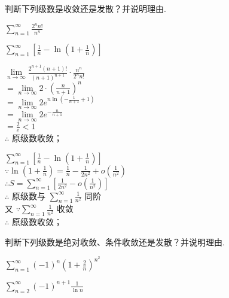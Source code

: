 \begin{problem}[points = 8]
判断下列级数是收敛还是发散？并说明理由.
\end{problem}
\begin{calculations}[columns = 2, label = (\arabic*), hsep = 8em]
    \item $\sum\limits_{n = 1}^{\infty} \frac{2^nn!}{n^n}$
    \item $\sum\limits_{n = 1}^{\infty} \left[\frac{1}{n} - \ln{\left(1 + \frac{1}{n}\right)}\right]$
\end{calculations}
\begin{solution}
    \begin{calculations}[columns = 2, label = (\arabic*), hsep = 5em]
        \item $\lim\limits_{n \to \infty} \frac{2^{n + 1}(n + 1)!}{(n + 1)^{n + 1}}\cdot\frac{n^n}{2^nn!}$ \\
        $= \lim\limits_{n \to \infty} 2\cdot\left(\frac{n}{n + 1}\right)^n$ \\
        $= \lim\limits_{n \to \infty} 2e^{n\ln{(-\frac{1}{n + 1} + 1)}}$ \\
        $= \lim\limits_{n \to \infty} 2e^{-\frac{n}{n + 1}}$ \\
        $= \frac{2}{e} < 1$ \\
        $\therefore$ 原级数收敛；

        \item $\sum\limits_{n = 1}^{\infty} \left[\frac{1}{n} - \ln{\left(1 + \frac{1}{n}\right)}\right]$ \\
        $\because \ln{\left(1 + \frac{1}{n}\right)} = \frac{1}{n} - \frac{1}{2n^2}+o\left(\frac{1}{n^2}\right)$ \\
        $\therefore S = \sum\limits_{n = 1}^{\infty} \left[\frac{1}{2n^2}-o\left(\frac{1}{n^2}\right)\right]$ \\
        $\therefore$ 原级数与 $\sum\limits_{n = 1}^{\infty} \frac{1}{n^2}$ 同阶 \\
        又 $\because \sum\limits_{n = 1}^{\infty} \frac{1}{n^2}$ 收敛 \\
        $\therefore$ 原级数收敛；
    \end{calculations}
\end{solution}

\begin{problem}[points = 8]
判断下列级数是绝对收敛、条件收敛还是发散？并说明理由.
\end{problem}
\begin{calculations}[columns = 2, label = (\arabic*)]
    \item $\sum\limits_{n = 1}^{\infty} (-1)^n\left(1 + \frac{2}{n}\right)^{n^2}$
    \item $\sum\limits_{n = 2}^{\infty} (-1)^{n + 1}\frac{1}{\ln{n}}$
\end{calculations}


